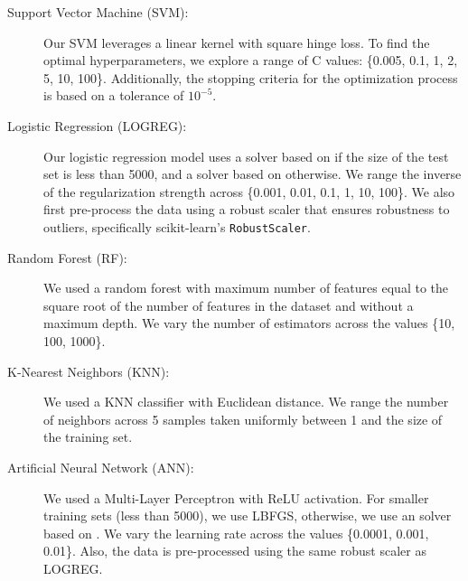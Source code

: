 \documentclass{article}
\begin{document}
\begin{description}
	\item[Support Vector Machine (SVM):] Our SVM leverages a linear kernel with
		square hinge loss. To find the optimal hyperparameters, we explore
		a range of C values: \{0.005, 0.1, 1, 2, 5, 10, 100\}. Additionally, the
		stopping criteria for the optimization process is based on a tolerance of
		$10^{-5}$.

	\item[Logistic Regression (LOGREG):] Our logistic regression model uses a
		solver based on \citet{liblinear} if the size of the test set is less than
		5000, and a solver based on \citet{saga} otherwise. We range the inverse of
		the regularization strength across \{0.001, 0.01, 0.1, 1, 10, 100\}. We
		also first pre-process the data using a robust scaler that ensures
		robustness to outliers, specifically scikit-learn's \verb+RobustScaler+.

	\item[Random Forest (RF):] We used a random forest with maximum number of
		features equal to the square root of the number of features in the dataset
		and without a maximum depth. We vary the number of estimators across the
		values \{10, 100, 1000\}.

	\item[K-Nearest Neighbors (KNN):] We used a KNN classifier with Euclidean
		distance. We range the number of neighbors across 5 samples taken uniformly
		between 1 and the size of the training set.

	\item[Artificial Neural Network (ANN):] We used a Multi-Layer Perceptron with
		ReLU activation. For smaller training sets (less than 5000), we use LBFGS,
		otherwise, we use an solver based on \citet{adam}. We vary the learning
		rate across the values \{0.0001, 0.001, 0.01\}. Also, the data is
		pre-processed using the same robust scaler as LOGREG.

\end{description}
\end{document}
